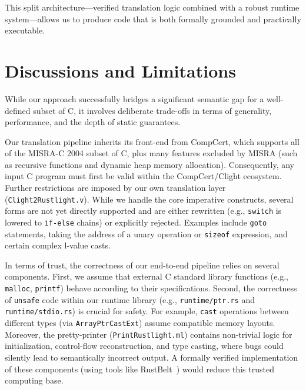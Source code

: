 \documentclass{llncs} %
\begin{document}
This split architecture—verified translation logic combined with a robust runtime system—allows us to produce code that is both formally grounded and practically executable.


\section{Discussions and Limitations}
\label{app:limitations}

While our approach successfully bridges a significant semantic gap for a well-defined subset of C, it involves deliberate trade-offs in terms of generality, performance, and the depth of static guarantees.

Our translation pipeline inherits its front-end from CompCert, which supports all of the MISRA-C 2004 subset of C, plus many features excluded by MISRA (such as recursive functions and dynamic heap memory allocation). Consequently, any input C program must first be valid within the CompCert/Clight ecosystem. Further restrictions are imposed by our own translation layer (\texttt{Clight2Rustlight.v}). While we handle the core imperative constructs, several forms are not yet directly supported and are either rewritten (e.g., \texttt{switch} is lowered to \texttt{if-else} chains) or explicitly rejected. Examples include \texttt{goto} statements, taking the address of a unary operation or \texttt{sizeof} expression, and certain complex l-value casts.

In terms of trust, the correctness of our end-to-end pipeline relies on several components. First, we assume that external C standard library functions (e.g., \texttt{malloc}, \texttt{printf}) behave according to their specifications. Second, the correctness of \texttt{unsafe} code within our runtime library (e.g., \texttt{runtime/ptr.rs} and \texttt{runtime/stdio.rs}) is crucial for safety. For example, \texttt{cast} operations between different types (via \texttt{ArrayPtrCastExt}) assume compatible memory layouts. Moreover, the pretty-printer (\texttt{PrintRustlight.ml}) contains non-trivial logic for initialization, control-flow reconstruction, and type casting, where bugs could silently lead to semantically incorrect output. A formally verified implementation of these components (using tools like RustBelt~\cite{Jung2017}) would reduce this trusted computing base.
\end{document}
